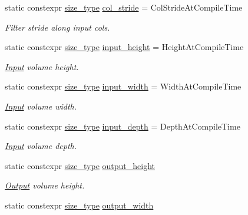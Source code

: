 \begin{DoxyCompactItemize}
static constexpr \hyperlink{namespaceffnn_a63b90a2fd70eb76684eac482a51633e5}{size\-\_\-type} \hyperlink{structffnn_1_1layer_1_1convolution__layer__options_ae76e5f96d43c1f6fd36d5c763a549922}{col\-\_\-stride} = Col\-Stride\-At\-Compile\-Time
\begin{DoxyCompactList}\small\item\em Filter stride along input cols. \end{DoxyCompactList}\item 
static constexpr \hyperlink{namespaceffnn_a63b90a2fd70eb76684eac482a51633e5}{size\-\_\-type} \hyperlink{structffnn_1_1layer_1_1convolution__layer__options_a9bbe1f21e099830ff076e893842d80ef}{input\-\_\-height} = Height\-At\-Compile\-Time
\begin{DoxyCompactList}\small\item\em \hyperlink{classffnn_1_1layer_1_1_input}{Input} volume height. \end{DoxyCompactList}\item 
static constexpr \hyperlink{namespaceffnn_a63b90a2fd70eb76684eac482a51633e5}{size\-\_\-type} \hyperlink{structffnn_1_1layer_1_1convolution__layer__options_ad08e81ef0c9d1a0b2687a0f07d0c2104}{input\-\_\-width} = Width\-At\-Compile\-Time
\begin{DoxyCompactList}\small\item\em \hyperlink{classffnn_1_1layer_1_1_input}{Input} volume width. \end{DoxyCompactList}\item 
static constexpr \hyperlink{namespaceffnn_a63b90a2fd70eb76684eac482a51633e5}{size\-\_\-type} \hyperlink{structffnn_1_1layer_1_1convolution__layer__options_ae4d23d286d13ecb3a1127bcf34569137}{input\-\_\-depth} = Depth\-At\-Compile\-Time
\begin{DoxyCompactList}\small\item\em \hyperlink{classffnn_1_1layer_1_1_input}{Input} volume depth. \end{DoxyCompactList}\item 
static constexpr \hyperlink{namespaceffnn_a63b90a2fd70eb76684eac482a51633e5}{size\-\_\-type} \hyperlink{structffnn_1_1layer_1_1convolution__layer__options_a8d7e31a6469ef53b7aa9673722d405b1}{output\-\_\-height}
\begin{DoxyCompactList}\small\item\em \hyperlink{classffnn_1_1layer_1_1_output}{Output} volume height. \end{DoxyCompactList}\item 
static constexpr \hyperlink{namespaceffnn_a63b90a2fd70eb76684eac482a51633e5}{size\-\_\-type} \hyperlink{structffnn_1_1layer_1_1convolution__layer__options_a3d9d4fcab54f0e960fe1e860fa2ee76e}{output\-\_\-width}

\end{DoxyCompactItemize}
